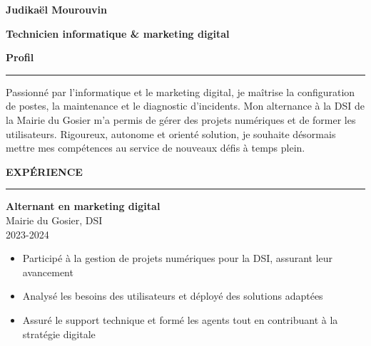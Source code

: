 \documentclass{article}
\newcommand{\cvsection}[1]{%
  \par\bigskip                %
  {\bfseries\Large #1}\par
  \noindent\rule{\linewidth}{0.8pt}\par
  \medskip                    %
}
\newcommand*{\ClipSep}{0.4cm}
\begin{document}
\pagestyle{empty}
\begin{paracol}{2}

\begin{minipage}{0.7\linewidth}
{\LARGE\textbf{Judikaël Mourouvin}}

\bigskip
{\large\textbf{Technicien informatique \& marketing digital}}
\end{minipage}\hfill
\begin{minipage}{0.18\linewidth}
\end{minipage}

\cvsection{Profil}
Passionné par l’informatique et le marketing digital, je maîtrise la configuration de postes, la maintenance et le diagnostic d’incidents. Mon alternance à la DSI de la Mairie du Gosier m’a permis de gérer des projets numériques et de former les utilisateurs. Rigoureux, autonome et orienté solution, je souhaite désormais mettre mes compétences au service de nouveaux défis à temps plein.

\cvsection{EXPÉRIENCE}

\colorbox{maincolor}{%
  \begin{minipage}{\linewidth}
    \textbf{Alternant en marketing digital} \\ Mairie du Gosier, DSI \\ 2023-2024
    \begin{itemize}
      \item Participé à la gestion de projets numériques pour la DSI, assurant leur avancement \item Analysé les besoins des utilisateurs et déployé des solutions adaptées \item Assuré le support technique et formé les agents tout en contribuant à la stratégie digitale
    \end{itemize}
  \end{minipage}}

\vspace{3mm}



\end{paracol}
\end{document}
